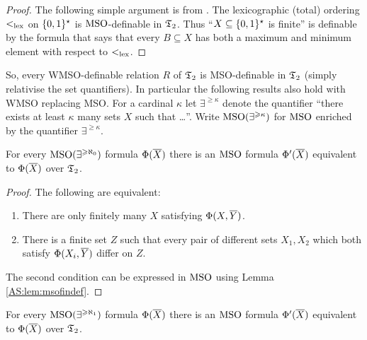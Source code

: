 \begin{proof}
The following simple argument is from \cite{Rabi69}.
The lexicographic (total) ordering $<_{\mathrm{lex}}$ on $\{0,1\}^\star$ is $\mbox{\rm MSO}$-definable in $\mathfrak{T}_2$.
Thus ``$X \subseteq \{0,1\}^\star$ is finite'' is definable by the formula that says that every $B \subseteq X$ has
both a maximum and minimum element with respect to $<_{\mathrm{lex}}$.
\end{proof}

So, every WMSO-definable relation $R$ of $\mathfrak{T}_2$ is MSO-definable in $\mathfrak{T}_2$ 
(simply relativise the set quantifiers). In particular the following results also hold with WMSO replacing MSO.
For a cardinal $\kappa$ let $\exists^{\geq \kappa}$ denote the quantifier ``there exists at least $\kappa$ many sets $X$ such that \dots''.
Write $\mbox{\rm {MSO}}(\exists^{\geqslant \kappa})$ for $\mbox{\rm MSO}$ enriched by the quantifier $\exists^{\geq \kappa}$. 

\begin{proposition} \cite{BKRa}
For every $\mbox{\rm {MSO}}(\exists^{\geqslant \aleph_0})$ formula $\Phi(\mbox{$\overline {X}$})$ there is an $\mbox{\rm MSO}$ formula 
$\Phi'(\mbox{$\overline {X}$})$ equivalent to $\Phi(\mbox{$\overline {X}$})$ over $\mathfrak{T}_2$.
\end{proposition}

\begin{proof}
The following are equivalent:
\begin{enumerate}
\item There are only finitely many $X$ satisfying $\Phi(X,\mbox{$\overline {Y}$})$. 
\item There is a finite set $Z$ such that every pair of different sets $X_1,X_2$ which both satisfy $\Phi(X_i,\mbox{$\overline {Y}$})$ differ on $Z$.
\end{enumerate}
The second condition can be expressed in $\mbox{\rm MSO}$ using Lemma \ref{AS:lem:msofindef}.
\end{proof}

\begin{theorem} \cite{BKRa}
For every $\mbox{\rm {MSO}}(\exists^{\geqslant \aleph_1})$ formula $\Phi(\mbox{$\overline {X}$})$ there is an $\mbox{\rm MSO}$ formula
$\Phi'(\mbox{$\overline {X}$})$ equivalent to $\Phi(\mbox{$\overline {X}$})$ over $\mathfrak{T}_2$.
\end{theorem}


